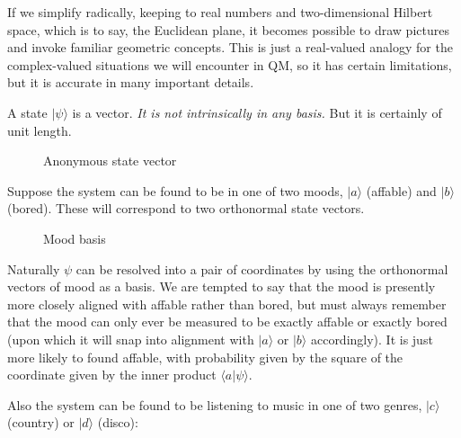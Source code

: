 If we simplify radically, keeping to real numbers and two-dimensional Hilbert space, which is to say, the Euclidean plane, it becomes possible to draw pictures and invoke familiar geometric concepts. This is just a real-valued analogy for the complex-valued situations we will encounter in QM, so it has certain limitations, but it is accurate in many important details.

A state $|\psi\rangle$ is a vector. \textit{It is not intrinsically in any basis.} But it is certainly of unit length.

\begin{figure}[h]
  \centering
  \centering
  \caption{Anonymous state vector} \label{fig:state-vector}
\end{figure}

Suppose the system can be found to be in one of two moods, $|a\rangle$ (affable) and $|b\rangle$ (bored). These will correspond to two orthonormal state vectors.

\begin{figure}[h]
  \centering
  \centering
  \caption{Mood basis} \label{fig:mood-basis}
\end{figure}

Naturally $\psi$ can be resolved into a pair of coordinates by using the orthonormal vectors of mood as a basis. We are tempted to say that the mood is presently more closely aligned with affable rather than bored, but must always remember that the mood can only ever be measured to be exactly affable or exactly bored (upon which it will snap into alignment with $|a\rangle$ or $|b\rangle$ accordingly). It is just more likely to found affable, with probability given by the square of the coordinate given by the inner product $\langle a|\psi \rangle$.

Also the system can be found to be listening to music in one of two genres, $|c\rangle$ (country) or $|d\rangle$ (disco):

